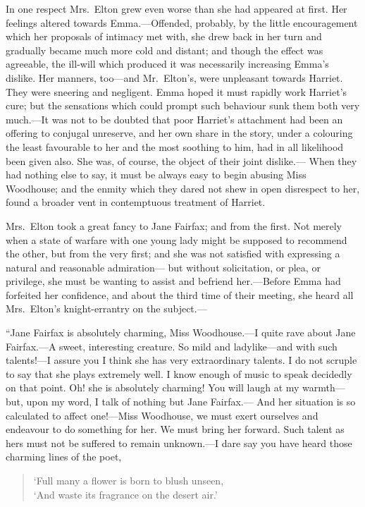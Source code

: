 In one respect Mrs.\ Elton grew even worse than she had appeared
at first.  Her feelings altered towards Emma.---Offended, probably,
by the little encouragement which her proposals of intimacy met with,
she drew back in her turn and gradually became much more cold
and distant; and though the effect was agreeable, the ill-will
which produced it was necessarily increasing Emma's dislike.
Her manners, too---and Mr.\ Elton's, were unpleasant towards Harriet.
They were sneering and negligent.  Emma hoped it must rapidly work
Harriet's cure; but the sensations which could prompt such behaviour
sunk them both very much.---It was not to be doubted that poor
Harriet's attachment had been an offering to conjugal unreserve,
and her own share in the story, under a colouring the least favourable
to her and the most soothing to him, had in all likelihood been
given also.  She was, of course, the object of their joint dislike.---%
When they had nothing else to say, it must be always easy to begin
abusing Miss Woodhouse; and the enmity which they dared not shew
in open disrespect to her, found a broader vent in contemptuous
treatment of Harriet.

Mrs.\ Elton took a great fancy to Jane Fairfax; and from the first.
Not merely when a state of warfare with one young lady might be
supposed to recommend the other, but from the very first; and she
was not satisfied with expressing a natural and reasonable admiration---%
but without solicitation, or plea, or privilege, she must be wanting
to assist and befriend her.---Before Emma had forfeited her confidence,
and about the third time of their meeting, she heard all Mrs.\ Elton's
knight-errantry on the subject.---%

``Jane Fairfax is absolutely charming, Miss Woodhouse.---I quite
rave about Jane Fairfax.---A sweet, interesting creature.  So mild
and ladylike---and with such talents!---I assure you I think she
has very extraordinary talents.  I do not scruple to say that she
plays extremely well.  I know enough of music to speak decidedly
on that point.  Oh! she is absolutely charming!  You will laugh at
my warmth---but, upon my word, I talk of nothing but Jane Fairfax.---%
And her situation is so calculated to affect one!---Miss Woodhouse,
we must exert ourselves and endeavour to do something for her.
We must bring her forward.  Such talent as hers must not be suffered
to remain unknown.---I dare say you have heard those charming lines of
the poet,

\begin{verse}
        `Full many a flower is born to blush unseen,\\
          `And waste its fragrance on the desert air.'
\end{verse}

